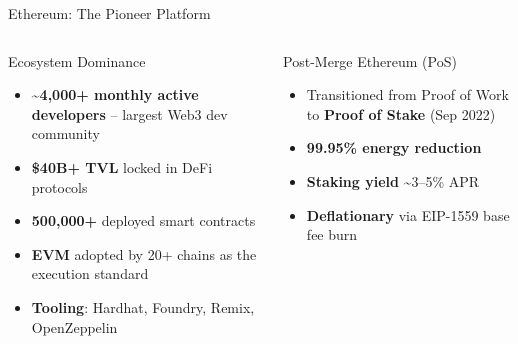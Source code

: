 \documentclass[8pt,aspectratio=169]{beamer}
\begin{document}
\begin{frame}{Ethereum: The Pioneer Platform}
\begin{columns}[T]
\begin{block}{Ecosystem Dominance}
\footnotesize
\begin{itemize}
  \item \textbf{\textasciitilde4,000+ monthly active developers} -- largest Web3 dev community
  \item \textbf{\$40B+ TVL} locked in DeFi protocols
  \item \textbf{500,000+} deployed smart contracts
  \item \textbf{EVM} adopted by 20+ chains as the execution standard
  \item \textbf{Tooling}: Hardhat, Foundry, Remix, OpenZeppelin
\end{itemize}
\end{block}
\vspace{2mm}
\begin{block}{Post-Merge Ethereum (PoS)}
\footnotesize
\begin{itemize}
  \item Transitioned from Proof of Work to \textbf{Proof of Stake} (Sep 2022)
  \item \textbf{99.95\% energy reduction}
  \item \textbf{Staking yield} \textasciitilde3--5\% APR
  \item \textbf{Deflationary} via EIP-1559 base fee burn
\end{itemize}
\end{block}


\end{columns}
\end{frame}
\end{document}
